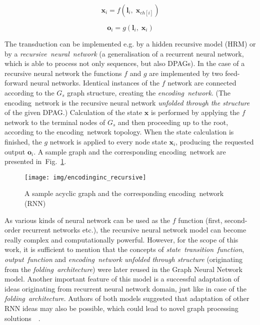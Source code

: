\begin{equation}
\bm{x}_i = f(\bm{l}_i, \; \bm{x}_{ch[i]})
\label{eq:recursive_state}
\end{equation}

\begin{equation}
	\bm{o}_i = g(\bm{l}_i, \; \bm{x}_i)
\label{eq:recursive_output}
\end{equation}

The transduction can be implemented e.g. by a hidden recursive model (HRM) or by a \emph{recursive~neural~network} (a generalisation of a recurrent neural network, which is able to process not only sequences, but also DPAGs). In the case of a recursive neural network the functions $f$ and $g$ are implemented by two feed-forward neural networks. Identical instances of the $f$ network are connected according to the $G_s$ graph structure, creating the \emph{encoding~network}. (The encoding~network is the recursive neural network \emph{unfolded through the structure} of the given DPAG.) Calculation of the state $\bm{x}$ is performed by applying the $f$ network to the terminal nodes of $G_s$ and then proceeding up to the root, according to the encoding~network topology. When the state calculation is finished, the $g$ network is applied to every node state $\bm{x}_i$, producing the requested output $\bm{o}_i$. A sample graph and the corresponding encoding~network are presented in~Fig.~\ref{fig:recursive}.

\begin{figure}
\begin{center}
	\texttt{[image: img/encodinginc\_recursive]}
	\caption{A sample acyclic graph and the corresponding encoding~network (RNN)}
	\label{fig:recursive}
\end{center}
\end{figure}

As various kinds of neural network can be used as the $f$ function (first, second-order recurrent networks etc.), the recursive neural network model can become really complex and computationally powerful. However, for the scope of this work, it is sufficient to mention that the concepts of \emph{state~transition~function}, \emph{output~function} and \emph{encoding~network unfolded through structure} (originating from the \emph{folding~architecture}) were later reused in the Graph Neural Network model. Another important feature of this model is a successful adaptation of ideas originating from recurrent neural network domain, just like in case of the \emph{folding~architecture}. Authors of both models suggested that adaptation of other RNN ideas may also be possible, which could lead to novel graph processing solutions~\cite{kuchler1996inductive}~\cite{frasconi1998general}.

